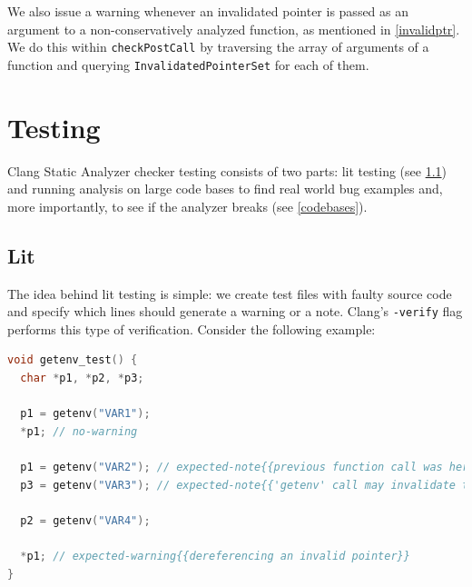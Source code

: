 We also issue a warning whenever an invalidated pointer is passed as an argument to a non-conservatively analyzed function, as mentioned in \ref{invalidptr}.
We do this within \lstinline{checkPostCall} by traversing the array of arguments of a function and querying \lstinline{InvalidatedPointerSet} for each of them. 






\section{Testing}

Clang Static Analyzer checker testing consists of two parts: lit testing (see \ref{lit}) and running analysis on large code bases to find real world bug examples and, more importantly, to see if the analyzer breaks (see \ref{codebases}). 

\subsection{Lit} \label{lit}

The idea behind lit testing is simple: we create test files with faulty source code and specify which lines should generate a warning or a note.
Clang's \lstinline{-verify} flag performs this type of verification.
Consider the following example: 

\begin{lstlisting}[language={C++}]
void getenv_test() {
  char *p1, *p2, *p3;

  p1 = getenv("VAR1");
  *p1; // no-warning

  p1 = getenv("VAR2"); // expected-note{{previous function call was here}}
  p3 = getenv("VAR3"); // expected-note{{'getenv' call may invalidate the the result of the previous 'getenv'}}

  p2 = getenv("VAR4");

  *p1; // expected-warning{{dereferencing an invalid pointer}}
}
\end{lstlisting}

